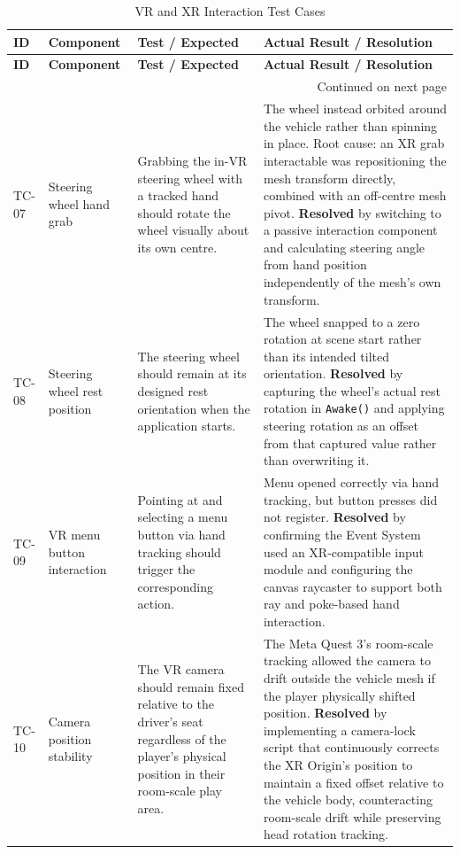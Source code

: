 {\small
\begin{longtable}{|p{1.3cm}|p{3cm}|p{4.5cm}|p{4.5cm}|}
\caption{VR and XR Interaction Test Cases}\label{tab:tc_vr}\\
\hline
\textbf{ID} & \textbf{Component} & \textbf{Test / Expected} & \textbf{Actual Result / Resolution} \\ \hline
\endfirsthead
\hline
\textbf{ID} & \textbf{Component} & \textbf{Test / Expected} & \textbf{Actual Result / Resolution} \\ \hline
\endhead
\hline \multicolumn{4}{r}{{Continued on next page}} \\
\endfoot
\endlastfoot

TC-07 & Steering wheel hand grab & Grabbing the in-VR steering wheel with a tracked hand should rotate the wheel visually about its own centre. & The wheel instead orbited around the vehicle rather than spinning in place. Root cause: an XR grab interactable was repositioning the mesh transform directly, combined with an off-centre mesh pivot. \textbf{Resolved} by switching to a passive interaction component and calculating steering angle from hand position independently of the mesh's own transform. \\ \hline

TC-08 & Steering wheel rest position & The steering wheel should remain at its designed rest orientation when the application starts. & The wheel snapped to a zero rotation at scene start rather than its intended tilted orientation. \textbf{Resolved} by capturing the wheel's actual rest rotation in \texttt{Awake()} and applying steering rotation as an offset from that captured value rather than overwriting it. \\ \hline

TC-09 & VR menu button interaction & Pointing at and selecting a menu button via hand tracking should trigger the corresponding action. & Menu opened correctly via hand tracking, but button presses did not register. \textbf{Resolved} by confirming the Event System used an XR-compatible input module and configuring the canvas raycaster to support both ray and poke-based hand interaction. \\ \hline

TC-10 & Camera position stability & The VR camera should remain fixed relative to the driver's seat regardless of the player's physical position in their room-scale play area. & The Meta Quest 3's room-scale tracking allowed the camera to drift outside the vehicle mesh if the player physically shifted position. \textbf{Resolved} by implementing a camera-lock script that continuously corrects the XR Origin's position to maintain a fixed offset relative to the vehicle body, counteracting room-scale drift while preserving head rotation tracking. \\ \hline


\end{longtable}}
